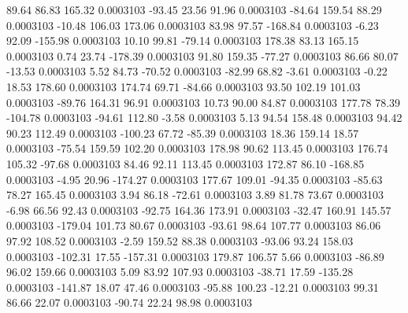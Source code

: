        89.64       86.83      165.32     0.0003103
      -93.45       23.56       91.96     0.0003103
      -84.64      159.54       88.29     0.0003103
      -10.48      106.03      173.06     0.0003103
       83.98       97.57     -168.84     0.0003103
       -6.23       92.09     -155.98     0.0003103
       10.10       99.81      -79.14     0.0003103
      178.38       83.13      165.15     0.0003103
        0.74       23.74     -178.39     0.0003103
       91.80      159.35      -77.27     0.0003103
       86.66       80.07      -13.53     0.0003103
        5.52       84.73      -70.52     0.0003103
      -82.99       68.82       -3.61     0.0003103
       -0.22       18.53      178.60     0.0003103
      174.74       69.71      -84.66     0.0003103
       93.50      102.19      101.03     0.0003103
      -89.76      164.31       96.91     0.0003103
       10.73       90.00       84.87     0.0003103
      177.78       78.39     -104.78     0.0003103
      -94.61      112.80       -3.58     0.0003103
        5.13       94.54      158.48     0.0003103
       94.42       90.23      112.49     0.0003103
     -100.23       67.72      -85.39     0.0003103
       18.36      159.14       18.57     0.0003103
      -75.54      159.59      102.20     0.0003103
      178.98       90.62      113.45     0.0003103
      176.74      105.32      -97.68     0.0003103
       84.46       92.11      113.45     0.0003103
      172.87       86.10     -168.85     0.0003103
       -4.95       20.96     -174.27     0.0003103
      177.67      109.01      -94.35     0.0003103
      -85.63       78.27      165.45     0.0003103
        3.94       86.18      -72.61     0.0003103
        3.89       81.78       73.67     0.0003103
       -6.98       66.56       92.43     0.0003103
      -92.75      164.36      173.91     0.0003103
      -32.47      160.91      145.57     0.0003103
     -179.04      101.73       80.67     0.0003103
      -93.61       98.64      107.77     0.0003103
       86.06       97.92      108.52     0.0003103
       -2.59      159.52       88.38     0.0003103
      -93.06       93.24      158.03     0.0003103
     -102.31       17.55     -157.31     0.0003103
      179.87      106.57        5.66     0.0003103
      -86.89       96.02      159.66     0.0003103
        5.09       83.92      107.93     0.0003103
      -38.71       17.59     -135.28     0.0003103
     -141.87       18.07       47.46     0.0003103
      -95.88      100.23      -12.21     0.0003103
       99.31       86.66       22.07     0.0003103
      -90.74       22.24       98.98     0.0003103
